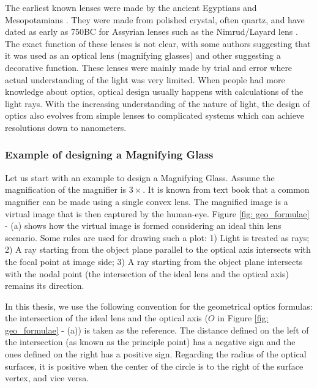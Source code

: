 The earliest known lenses were made by the ancient Egyptians and Mesopotamians \cite{wiki:HistoryofOptics}. They were made from polished crystal, often quartz, and have dated as early as 750BC for Assyrian lenses such as the Nimrud/Layard lens \cite{wiki:Nimrudlens}. The exact function of these lenses is not clear, with some authors suggesting that it was used as an optical lens (magnifying glasses) and other suggesting a decorative function. These lenses were mainly made by trial and error where actual understanding of the light was very limited. When people had more knowledge about optics, optical design usually happens with calculations of the light rays. With the increasing understanding of the nature of light, the design of optics also evolves from simple lenses to complicated systems which can achieve resolutions down to nanometers. 


\subsubsection{Example of designing a Magnifying Glass} \label{magnifier}
\vspace{1em}
Let us start with an example to design a Magnifying Glass. Assume the magnification of the magnifier is $3\times$. It is known from text book\cite{hecht2012optics} that a common magnifier can be made using a single convex lens. The magnified image is a virtual image that is then captured by the human-eye. Figure \ref{fig: geo_formulae} - (a) shows how the virtual image is formed considering an ideal thin lens scenario. Some rules are used for drawing such a plot:
1) Light is treated as rays;
2) A ray starting from the object plane parallel to the optical axis intersects with the focal point at image side;
3) A ray starting from the object plane intersects with the nodal point (the intersection of the ideal lens and the optical axis) remains its direction.

In this thesis, we use the following convention for the geometrical optics formulas: the intersection of the ideal lens and the optical axis ($O$ in Figure \ref{fig: geo_formulae} - (a)) is taken as the reference. The distance defined on the left of the intersection (as known as the principle point) has a negative sign and the ones defined on the right has a positive sign. Regarding the radius of the optical surfaces, it is positive when the center of the circle is to the right of the surface vertex, and vice versa. 

